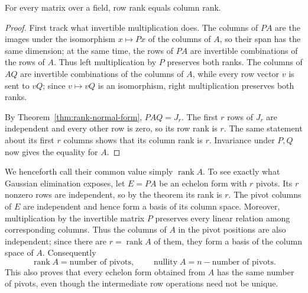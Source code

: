 \begin{theorem}\label{thm:row-column-rank}
For every matrix over a field, row rank equals column rank.
\end{theorem}
\begin{proof}
First track what invertible multiplication does.  The columns of \(PA\) are
the images under the isomorphism \(x\mapsto Px\) of the columns of \(A\), so
their span has the same dimension; at the same time, the rows of \(PA\) are
invertible combinations of the rows of \(A\).  Thus left multiplication by
\(P\) preserves both ranks.  The columns of \(AQ\) are invertible combinations
of the columns of \(A\), while every row vector \(v\) is sent to \(vQ\); since
\(v\mapsto vQ\) is an isomorphism, right multiplication preserves both ranks.

By Theorem~\ref{thm:rank-normal-form}, \(PAQ=J_r\).  The first \(r\) rows of
\(J_r\) are independent and every other row is zero, so its row rank is \(r\).
The same statement about its first \(r\) columns shows that its column rank is
\(r\).  Invariance under \(P,Q\) now gives the equality for \(A\).
\end{proof}

We henceforth call their common value simply \(\operatorname{rank}A\).
To see exactly what Gaussian elimination exposes, let \(E=PA\) be an echelon
form with \(r\) pivots.  Its \(r\) nonzero rows are independent, so by the
theorem its rank is \(r\).  The pivot columns of \(E\) are independent and
hence form a basis of its column space.  Moreover, multiplication by the
invertible matrix \(P\) preserves every linear relation among corresponding
columns.  Thus the columns of \(A\) in the pivot positions are also
independent; since there are \(r=\operatorname{rank}A\) of them, they form a
basis of the column space of \(A\).  Consequently
\[
\operatorname{rank}A=\text{number of pivots},
\qquad
\operatorname{nullity}A=n-\text{number of pivots}.
\]
This also proves that every echelon form obtained from \(A\) has the same
number of pivots, even though the intermediate row operations need not be
unique.

